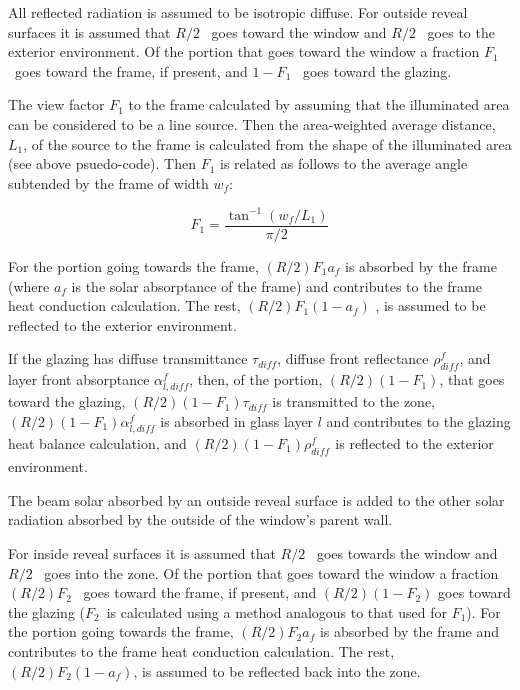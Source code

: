 All reflected radiation is assumed to be isotropic diffuse. For outside reveal surfaces it is assumed that \(R/2\) ~goes toward the window and \(R/2\) ~goes to the exterior environment. Of the portion that goes toward the window a fraction \({F_1}\) ~goes toward the frame, if present, and \(1 - {F_1}\) ~goes toward the glazing.

The view factor \({F_1}\) to the frame calculated by assuming that the illuminated area can be considered to be a line source. Then the area-weighted average distance, \({L_1}\), of the source to the frame is calculated from the shape of the illuminated area (see above psuedo-code). Then \({F_1}\) is related as follows to the average angle subtended by the frame of width \({w_f}\):

\begin{equation}
{F_1} = \frac{{{{\tan }^{ - 1}}({w_f}/{L_1})}}{{\pi /2}}
\end{equation}

For the portion going towards the frame, \((R/2){F_1}{a_f}\) is absorbed by the frame (where \({a_f}\) is the solar absorptance of the frame) and contributes to the frame heat conduction calculation. The rest, \((R/2){F_1}(1 - {a_f})\) , is assumed to be reflected to the exterior environment.

If the glazing has diffuse transmittance \({\tau_{diff}}\), diffuse front reflectance \(\rho_{diff}^f\), and layer front absorptance \(\alpha_{l,diff}^f\), then, of the portion, \((R/2)(1 - {F_1})\), that goes toward the glazing, \((R/2)(1 - {F_1}){\tau_{diff}}\) is transmitted to the zone, \((R/2)(1 - {F_1})\alpha_{l,diff}^f\) is absorbed in glass layer \(l\) and contributes to the glazing heat balance calculation, and \((R/2)(1 - {F_1})\rho_{dif{f_{}}}^f\) is reflected to the exterior environment.

The beam solar absorbed by an outside reveal surface is added to the other solar radiation absorbed by the outside of the window's parent wall.

For inside reveal surfaces it is assumed that \(R/2\) ~goes towards the window and \(R/2\) ~goes into the zone. Of the portion that goes toward the window a fraction \((R/2){F_2}\) ~goes toward the frame, if present, and \((R/2)(1 - {F_2})\) goes toward the glazing (\({F_2}\)~is calculated using a method analogous to that used for \({F_1}\)). For the portion going towards the frame, \((R/2){F_2}{a_f}\) is absorbed by the frame and contributes to the frame heat conduction calculation. The rest, \((R/2){F_2}(1 - {a_f})\), is assumed to be reflected back into the zone.


